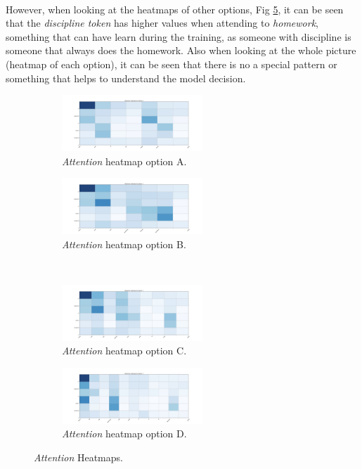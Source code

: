 \paragraph{}
However, when looking at the heatmaps of other options, Fig \ref{fig:attention-heatmap-examples}, it can be seen that the \emph{discipline token} has higher values when attending to \emph{homework}, something that can have learn during the training, as someone with discipline is someone that always does the homework. Also when looking at the whole picture (heatmap of each option), it can be seen that there is no a special pattern or something that helps to understand the model decision. 
\begin{figure}[h]
\centering
\begin{subfigure}{0.45\textwidth}
  \centering
	\includegraphics[width=200px]{images/attention_heatmap_0}
	\caption{\emph{Attention} heatmap option A.}
	\label{fig:att-hm-a}
\end{subfigure}
\begin{subfigure}{0.45\textwidth}
  \centering
	\includegraphics[width=200px]{images/attention_heatmap_1}
	\caption{\emph{Attention} heatmap option B.}
	\label{fig:att-hm-b}
\end{subfigure}
\medskip\\
\begin{subfigure}{0.45\textwidth}
  \centering
	\includegraphics[width=200px]{images/attention_heatmap_2}
	\caption{\emph{Attention} heatmap option C.}
	\label{fig:att-hm-c}
\end{subfigure}
\begin{subfigure}{0.45\textwidth}
  \centering
	\includegraphics[width=200px]{images/attention_heatmap_3}
	\caption{\emph{Attention} heatmap option D.}
	\label{fig:att-hm-d}
\end{subfigure}
\caption{\emph{Attention} Heatmaps.}
\label{fig:attention-heatmap-examples}
\end{figure}


